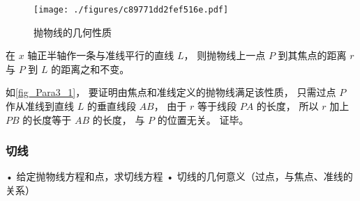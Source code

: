 \begin{figure}[ht]
\centering
\texttt{[image: ./figures/c89771dd2fef516e.pdf]}
\caption{抛物线的几何性质} \label{fig_Para3_1}
\end{figure}

在 $x$ 轴正半轴作一条与准线平行的直线 $L$， 则抛物线上一点 $P$ 到其焦点的距离 $r$ 与 $P$ 到 $L$ 的距离之和不变。

如\autoref{fig_Para3_1}， 要证明由焦点和准线定义的抛物线满足该性质， 只需过点 $P$ 作从准线到直线 $L$ 的垂直线段 $AB$， 由于 $r$ 等于线段 $PA$ 的长度， 所以 $r$ 加上 $PB$ 的长度等于 $AB$ 的长度， 与 $P$ 的位置无关。 证毕。
\subsubsection{切线}
	•	给定抛物线方程和点，求切线方程
	•	切线的几何意义（过点，与焦点、准线的关系）
